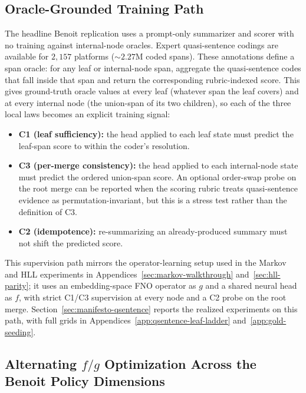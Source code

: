 \subsection{Oracle-Grounded Training Path}

The headline Benoit replication uses a prompt-only summarizer and
scorer with no training against internal-node oracles. Expert
quasi-sentence codings are available for $2{,}157$ platforms
($\sim\!2.27$M coded spans). These annotations define a span oracle:
for any leaf or internal-node span, aggregate the quasi-sentence codes
that fall inside that span and return the corresponding rubric-indexed
score. This gives ground-truth oracle values at every leaf (whatever
span the leaf covers) and at every internal node (the union-span of its
two children), so each of the three local laws becomes an explicit
training signal:

\begin{itemize}[leftmargin=1.5em]
    \item \textbf{C1 (leaf sufficiency):} the head applied to each
          leaf state must predict the leaf-span score to within the
          coder's resolution.
    \item \textbf{C3 (per-merge consistency):} the head applied to each
          internal-node state must predict the ordered union-span score.
          An optional order-swap probe on the root merge can be reported
          when the scoring rubric treats quasi-sentence evidence as
          permutation-invariant, but this is a stress test rather than
          the definition of C3.
    \item \textbf{C2 (idempotence):} re-summarizing an already-produced
          summary must not shift the predicted score.
\end{itemize}

This supervision path mirrors the operator-learning setup used in the
Markov and HLL experiments in
Appendices~\ref{sec:markov-walkthrough} and~\ref{sec:hll-parity}; it uses
an embedding-space FNO operator as $g$ and a shared neural head as
$f$, with strict C1/C3 supervision at every node and a C2 probe on
the root merge. Section~\ref{sec:manifesto-qsentence} reports the
realized experiments on this path, with full grids in
Appendices~\ref{app:qsentence-leaf-ladder}
and~\ref{app:gold-seeding}.

\subsection[Alternating f/g Optimization Across the Benoit Dimensions]{Alternating $f/g$ Optimization Across the Benoit
Policy Dimensions}\label{app:rile-fg-ladder}

